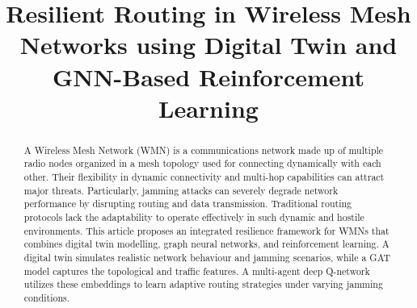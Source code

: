 \documentclass[conference]{IEEEtran}
\begin{document}
\title{Resilient Routing in Wireless Mesh Networks using Digital Twin and GNN-Based Reinforcement Learning}

\author{
  \and
  \and
}
\maketitle

\begin{abstract}
A Wireless Mesh Network (WMN) is a communications network made up of multiple radio nodes organized in a mesh topology used for connecting dynamically with each other. Their flexibility in dynamic connectivity and multi-hop capabilities can attract major threats. Particularly, jamming attacks can severely degrade network performance by disrupting routing and data transmission. Traditional routing protocols lack the adaptability to operate effectively in such dynamic and hostile environments. This article proposes an integrated resilience framework for WMNs that combines digital twin modelling, graph neural networks, and reinforcement learning. A digital twin simulates realistic network behaviour and jamming scenarios, while a GAT model captures the topological and traffic features. A multi-agent deep Q-network utilizes these embeddings to learn adaptive routing strategies under varying jamming conditions.
\end{abstract}
\end{document}
